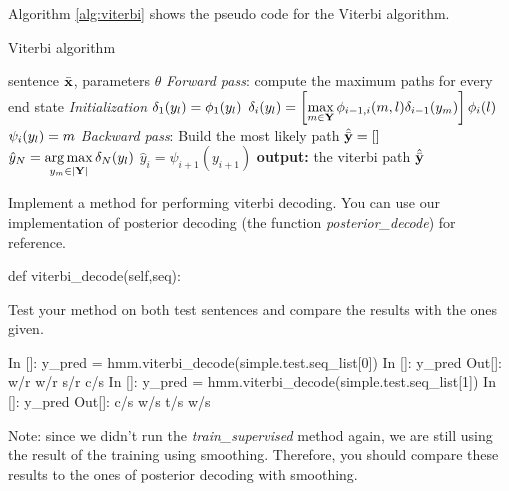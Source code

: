 Algorithm \ref{alg:viterbi} shows the pseudo code for the Viterbi algorithm.
\begin{algorithm}[t]
   \caption{Viterbi algorithm \label{alg:viterbi}}
\begin{algorithmic}[1]
    sentence $\bar{\mathbf{x}}$, parameters $\theta$
        \STATE  \emph{Forward pass}: compute the maximum paths for
        every end state
        \STATE \emph{Initialization}
        \STATE $\delta_1({y}_l) = \phi_1({y}_l)$
        \ENDFOR 
                 \STATE $\delta_i({y}_l) = \left[ \displaystyle
                   \max_{m  \in \mathbf{Y}} \phi_{i-1,i}(m,l)
                   \delta_{i-1}({y}_m) \right] \phi_i(l)$
                 \STATE $\psi_{i}({y}_l) = m$
         \ENDFOR 
        \ENDFOR 
       \STATE \emph{Backward pass}: Build the most likely path
       \STATE $\hat {\bar{\mathbf{y}}} = []$ 
       \STATE $\hat y_N = \displaystyle \operatorname*{arg\,max}_{{y}_m  \in
                   |\mathbf{Y} |}  \delta_N({y}_l)$
        \STATE $\hat  y_i = \psi_{i+1}(y_{i+1})$
        \ENDFOR 
       \STATE \textbf{output:} the viterbi path $\hat {\bar{\mathbf{y}}}$
\end{algorithmic}
\end{algorithm}


\begin{exercise}
Implement a method for performing viterbi decoding. You can use our implementation of posterior decoding (the function \emph{posterior\_decode}) for reference.
\begin{python}
        def viterbi_decode(self,seq):
\end{python}

Test your method on both test sentences and compare the results with
the ones given.
\begin{python}
In []: y_pred = hmm.viterbi_decode(simple.test.seq_list[0])
In []: y_pred
Out[]: w/r w/r s/r c/s 
In []: y_pred = hmm.viterbi_decode(simple.test.seq_list[1])
In []: y_pred
Out[]: c/s w/s t/s w/s 
\end{python}

Note: since we didn't run the \emph{train\_supervised} method again, we are still using the result of the training using smoothing. Therefore, you should compare these results to the ones of posterior decoding with smoothing.

\end{exercise}




